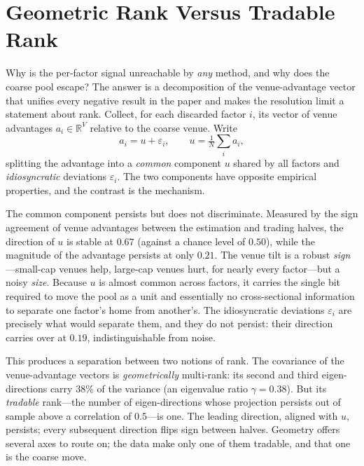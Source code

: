 \documentclass[12pt]{article}
\theoremstyle{plain}
\theoremstyle{definition}
\begin{document}
\section{Geometric Rank Versus Tradable Rank}
\label{sec:rank}

Why is the per-factor signal unreachable by \emph{any} method, and why does the
coarse pool escape? The answer is a decomposition of the venue-advantage vector
that unifies every negative result in the paper and makes the resolution limit a
statement about rank. Collect, for each discarded factor $i$, its vector of
venue advantages $a_i\in\mathbb{R}^{V}$ relative to the coarse venue. Write
\begin{equation}
a_i = u + \varepsilon_i,\qquad u=\tfrac{1}{N}\textstyle\sum_i a_i,
\label{eq:advdecomp}
\end{equation}
splitting the advantage into a \emph{common} component $u$ shared by all factors
and \emph{idiosyncratic} deviations $\varepsilon_i$. The two components have
opposite empirical properties, and the contrast is the mechanism.

The common component persists but does not discriminate. Measured by the sign
agreement of venue advantages between the estimation and trading halves, the
direction of $u$ is stable at $0.67$ (against a chance level of $0.50$), while the
magnitude of the advantage persists at only $0.21$. The venue tilt is a robust
\emph{sign}---small-cap venues help, large-cap venues hurt, for nearly every
factor---but a noisy \emph{size}. Because $u$ is almost common across factors, it
carries the single bit required to move the pool as a unit and essentially no
cross-sectional information to separate one factor's home from another's. The
idiosyncratic deviations $\varepsilon_i$ are precisely what would separate them,
and they do not persist: their direction carries over at $0.19$, indistinguishable
from noise.

This produces a separation between two notions of rank. The covariance of the
venue-advantage vectors is \emph{geometrically} multi-rank: its second and third
eigen-directions carry $38\%$ of the variance (an eigenvalue ratio
$\gamma=0.38$). But its \emph{tradable} rank---the number of eigen-directions
whose projection persists out of sample above a correlation of $0.5$---is one.
The leading direction, aligned with $u$, persists; every subsequent direction
flips sign between halves. Geometry offers several axes to route on; the data
make only one of them tradable, and that one is the coarse move.
\end{document}
